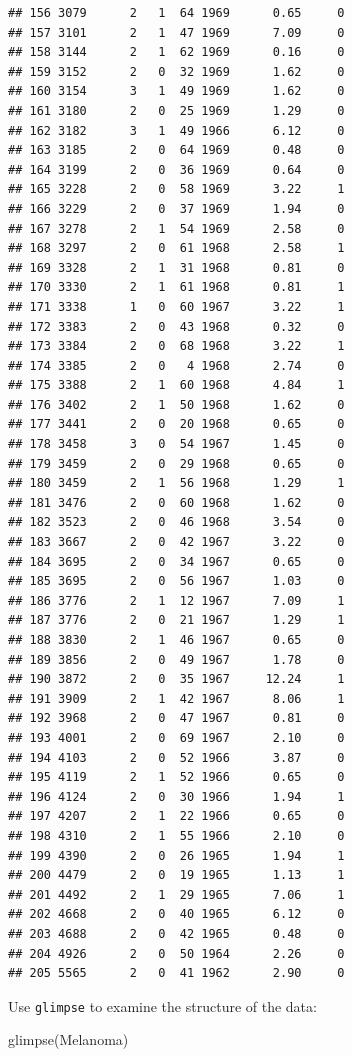 \documentclass[
]{book}
\newenvironment{Shaded}{\begin{snugshade}}{\end{snugshade}}
\newcommand{\FunctionTok}[1]{\textcolor[rgb]{0.00,0.00,0.00}{#1}}
\newcommand{\NormalTok}[1]{#1}
\begin{document}
\begin{verbatim}
## 156 3079      2   1  64 1969      0.65     0
## 157 3101      2   1  47 1969      7.09     0
## 158 3144      2   1  62 1969      0.16     0
## 159 3152      2   0  32 1969      1.62     0
## 160 3154      3   1  49 1969      1.62     0
## 161 3180      2   0  25 1969      1.29     0
## 162 3182      3   1  49 1966      6.12     0
## 163 3185      2   0  64 1969      0.48     0
## 164 3199      2   0  36 1969      0.64     0
## 165 3228      2   0  58 1969      3.22     1
## 166 3229      2   0  37 1969      1.94     0
## 167 3278      2   1  54 1969      2.58     0
## 168 3297      2   0  61 1968      2.58     1
## 169 3328      2   1  31 1968      0.81     0
## 170 3330      2   1  61 1968      0.81     1
## 171 3338      1   0  60 1967      3.22     1
## 172 3383      2   0  43 1968      0.32     0
## 173 3384      2   0  68 1968      3.22     1
## 174 3385      2   0   4 1968      2.74     0
## 175 3388      2   1  60 1968      4.84     1
## 176 3402      2   1  50 1968      1.62     0
## 177 3441      2   0  20 1968      0.65     0
## 178 3458      3   0  54 1967      1.45     0
## 179 3459      2   0  29 1968      0.65     0
## 180 3459      2   1  56 1968      1.29     1
## 181 3476      2   0  60 1968      1.62     0
## 182 3523      2   0  46 1968      3.54     0
## 183 3667      2   0  42 1967      3.22     0
## 184 3695      2   0  34 1967      0.65     0
## 185 3695      2   0  56 1967      1.03     0
## 186 3776      2   1  12 1967      7.09     1
## 187 3776      2   0  21 1967      1.29     1
## 188 3830      2   1  46 1967      0.65     0
## 189 3856      2   0  49 1967      1.78     0
## 190 3872      2   0  35 1967     12.24     1
## 191 3909      2   1  42 1967      8.06     1
## 192 3968      2   0  47 1967      0.81     0
## 193 4001      2   0  69 1967      2.10     0
## 194 4103      2   0  52 1966      3.87     0
## 195 4119      2   1  52 1966      0.65     0
## 196 4124      2   0  30 1966      1.94     1
## 197 4207      2   1  22 1966      0.65     0
## 198 4310      2   1  55 1966      2.10     0
## 199 4390      2   0  26 1965      1.94     1
## 200 4479      2   0  19 1965      1.13     1
## 201 4492      2   1  29 1965      7.06     1
## 202 4668      2   0  40 1965      6.12     0
## 203 4688      2   0  42 1965      0.48     0
## 204 4926      2   0  50 1964      2.26     0
## 205 5565      2   0  41 1962      2.90     0
\end{verbatim}

Use \texttt{glimpse} to examine the structure of the data:

\begin{Shaded}
\begin{Highlighting}[]
\FunctionTok{glimpse}\NormalTok{(Melanoma)}
\end{Highlighting}
\end{Shaded}
\end{document}
